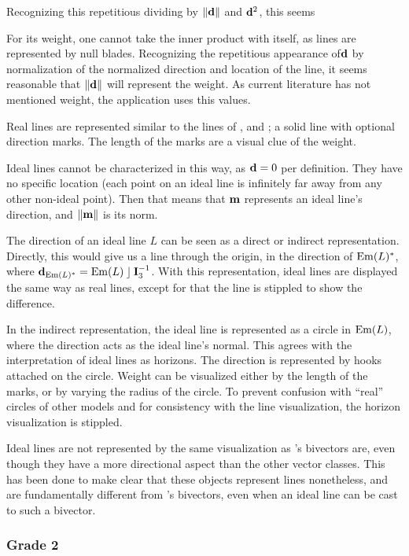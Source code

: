 Recognizing this repetitious dividing by $\left\|\mathbf{d}\right\|$ and $\mathbf{d}^2$, this seems

For its weight, one cannot take the inner product with itself, as lines are represented by null blades.  Recognizing the repetitious appearance of$\mathbf{d}$ by normalization of the normalized direction and location of the line, it seems reasonable that $\left\|\mathbf{d}\right\|$ will represent the weight.  As current literature has not mentioned weight, the application uses this values.

Real lines are represented similar to the lines of \pga, \cga and \cbga; a solid line with optional direction marks.  The length of the marks are a visual clue of the weight.

Ideal lines cannot be characterized in this way, as $\mathbf{d} = 0$ per definition.  They have no specific location (each point on an ideal line is infinitely far away from any other non-ideal point).  Then that means that $\mathbf{m}$ represents an ideal line's direction, and $\left\|\mathbf{m}\right\|$ is its norm.

The direction of an ideal line $L$ can be seen as a direct or indirect representation.  Directly, this would give us a line through the origin, in the direction of $\operatorname{Em}(L)^\ast$, where $\mathbf{d}_{\operatorname{Em}(L)^\ast} = \operatorname{Em}(L) \mathbin{\rfloor} \mathbf{I}_3^{-1}$.  With this representation, ideal lines are displayed the same way as real lines, except for that the line is stippled to show the difference. 

In the indirect representation, the ideal line is represented as a circle in $\operatorname{Em}(L)$, where the direction acts as the ideal line's normal.  This agrees with the interpretation of ideal lines as horizons.  The direction is represented by hooks attached on the circle.  Weight can be visualized either by the length of the marks, or by varying the radius of the circle.  To prevent confusion with ``real'' circles of other models and for consistency with the line visualization, the horizon visualization is stippled.

Ideal lines are not represented by the same visualization as \ega's bivectors are, even though they have a more directional aspect than the other vector classes.  This has been done to make clear that these objects represent lines nonetheless, and are fundamentally different from \ega's bivectors, even when an ideal line can be cast to such a bivector.



\subsubsection{Grade 2}


